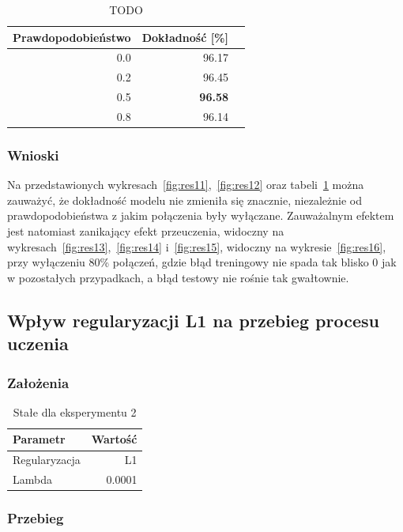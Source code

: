 \documentclass{article}
\begin{document}
\begin{table}[H]
	\caption{TODO}
	\label{tabela-res-11}
	\centering
	\begin{tabular}{rrr}
		\toprule
		Prawdopodobieństwo & Dokładność [\%] \\
		\midrule
		0.0                 & 96.17              \\
		0.2                 & 96.45              \\
		0.5                 & \textbf{96.58}     \\
		0.8                 & 96.14              \\
		\bottomrule
	\end{tabular}
\end{table}

\subsubsection*{Wnioski}
Na przedstawionych wykresach~\ref{fig:res11},~\ref{fig:res12} oraz tabeli~\ref{tabela-res-11} można zauważyć, że dokładność modelu nie zmieniła się znacznie, niezależnie od prawdopodobieństwa z jakim połączenia były wyłączane. Zauważalnym efektem jest natomiast zanikający efekt przeuczenia, widoczny na wykresach~\ref{fig:res13},~\ref{fig:res14} i~\ref{fig:res15}, widoczny na wykresie~\ref{fig:res16}, przy wyłączeniu 80\% połączeń, gdzie błąd treningowy nie spada tak blisko 0 jak w pozostałych przypadkach, a błąd testowy nie rośnie tak gwałtownie.

\newpage
\subsection{Wpływ regularyzacji L1 na przebieg procesu uczenia}
\subsubsection*{Założenia}
\begin{table}[H]
	\caption{Stałe dla eksperymentu 2}
	\label{tabela-const-2}
	\centering
	\begin{tabular}{lr}
		\toprule
		Parametr      & Wartość \\
		\midrule
		Regularyzacja & L1        \\
		Lambda        & 0.0001    \\
		\bottomrule
	\end{tabular}
\end{table}

\subsubsection*{Przebieg}
\end{document}
